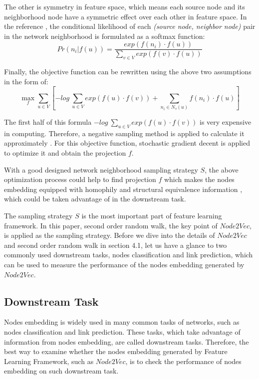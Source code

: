 \documentclass[sigconf]{acmart}
\begin{document}
The other is symmetry in feature space, which means each source node and its neighborhood node have a symmetric effect over each other in feature space. In the reference \cite{node2vec}, the conditional likelihood of each \textit{(source node, neighbor node)} pair in the network neighborhood is formulated as a softmax function:
$$Pr(n_i|f(u))=\frac{exp(f(n_i)\cdot f(u))}{\sum_{v\in V} exp(f(v)\cdot f(u))}$$

Finally, the objective function can be rewritten using the above two assumptions in the form of:
$$\mathop{max}\limits_{f} \sum_{u\in V}[-log\ \sum_{u\in V}exp(f(u)\cdot f(v))+ \sum_{n_i\in N_s(u)}f(n_i)\cdot f(u)]$$

The first half of this formula $-log\ \sum_{u\in V}exp(f(u)\cdot f(v))$ is very expensive in computing. Therefore, a negative sampling method is applied to calculate it approximately \cite{mikolov2013distributed}. For this objective function, stochastic gradient decent is applied to optimize it and obtain the projection $f$.

With a good designed network neighborhood sampling strategy $S$, the above optimization process could help to find projection $f$ which makes the nodes embedding equipped with homophily and structural equivalence information \cite{hoff2002latent}, which could be taken advantage of in the downstream task.

The sampling strategy $S$ is the most important part of feature learning framework. In this paper,  second order random walk, the key point of $Node2Vec$, is applied as the sampling strategy. Before we dive into the details of $Node2Vec$ and second order random walk in section 4.1, let us have a glance to two commonly used downstream tasks, nodes classification and link prediction, which can be used to measure the performance of the nodes embedding generated by $Node2Vec$. 

\subsection{Downstream Task}

Nodes embedding is widely used in many common tasks of networks, such as nodes classification and link prediction. These tasks, which take advantage of information from nodes embedding, are called downstream tasks. Therefore, the best way to examine whether the nodes embedding generated by Feature Learning Framework, such as $Node2Vec$, is to check the performance of nodes embedding on such downstream task.
\end{document}
